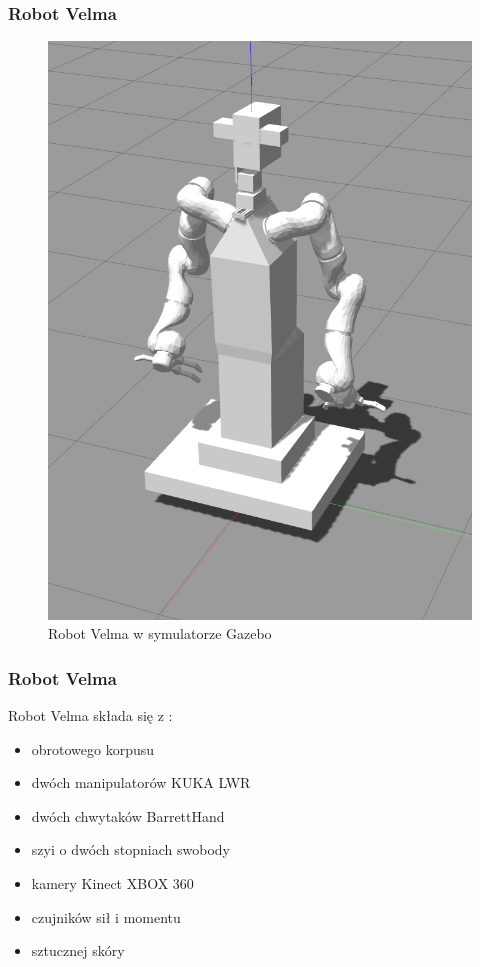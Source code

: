 \begin{frame}
\frametitle{Robot Velma}
\begin{figure}
	\includegraphics[scale=0.20]{./images/velma_gz_cropped.png}
	\caption{Robot Velma w symulatorze Gazebo}
\end{figure}
\end{frame}


\begin{frame}
\frametitle{Robot Velma}
Robot Velma składa się z \cite{docsVelma}:  
\begin{itemize}
	\item obrotowego korpusu
	\item dwóch manipulatorów KUKA LWR
	\item dwóch chwytaków BarrettHand
	\item szyi o dwóch stopniach swobody
	\item kamery Kinect XBOX 360
	\item czujników sił i momentu
	\item sztucznej skóry
\end{itemize}
\end{frame}

